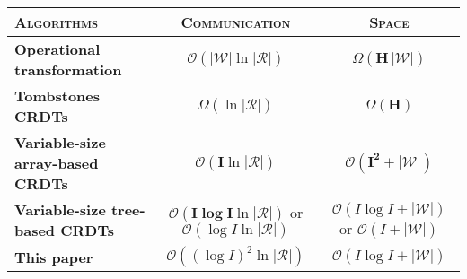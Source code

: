 

\begin{tabular}{@{}lcc@{}}
  \toprule
  \textsc{Algorithms} & \textsc{Communication} & \textsc{Space} \\ \midrule 
  \textbf{Operational transformation~\cite{suleiman1997serialization, sun2009contextbased}} & $\mathcal{O}(\pmb{|\mathcal{W}|}\ln|\mathcal{R}|)$ & $\Omega (\pmb{H\,|\mathcal{W}|})$ \\ \midrule
  \textbf{Tombstones CRDTs~\cite{ahmed2011evaluating, conway2014language, oster2006data, roh2011replicated, weiss2007wooki, wu2010partial, yu2012stringwise}} & $\Omega (\ln|\mathcal{R}|)$ & $\Omega (\pmb{H})$ \\ \midrule
  \textbf{Variable-size array-based CRDTs~\cite{weiss2009logoot}} & $\mathcal{O}(\pmb{I}\ln |\mathcal{R}|)$ & $\mathcal{O}(\pmb{I^2+|\mathcal{W}|})$ \\ \midrule
  \textbf{Variable-size tree-based CRDTs~\cite{preguica2009commutative}} & $\mathcal{O}(\pmb{I\log I} \ln |\mathcal{R}|)$ or $\mathcal{O}(\log I\ln|\mathcal{R}|)$ & $\mathcal{O}(I\log I + \pmb{|\mathcal{W}|})$ or $\mathcal{O}(I + \pmb{|\mathcal{W}|})$ \\ \midrule
  \textbf{This paper~\cite{nedelec2013lseq}} & $\mathcal{O}((\log I)^2\ln|\mathcal{R}|)$ & $\mathcal{O}(I\log I + \pmb{|\mathcal{W}|})$ \\ \bottomrule
\end{tabular}

